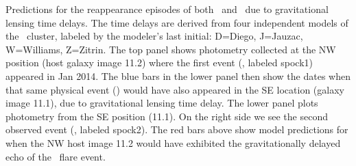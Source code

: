 \label{fig:SpockDelayPredictions}
Predictions for the reappearance episodes of both \spockone\ and \spocktwo\, due to gravitational lensing time delays.  The time delays are derived from four independent models of the \ cluster, labeled by the modeler's last initial: D=Diego, J=Jauzac, W=Williams, Z=Zitrin.  The top panel shows photometry collected at the NW position (host galaxy image 11.2) where the first event (\spockone, labeled spock1) appeared in Jan 2014. The blue bars in the lower panel then show the dates when that same physical event (\spockone) would have also appeared in the SE location (galaxy image 11.1), due to gravitational lensing time delay.  The lower panel plots photometry from the SE position (11.1). On the right side we see the second observed event (\spocktwo, labeled spock2).  The red bars above show model predictions for when the NW host image 11.2 would have exhibited the gravitationally delayed echo of the \spocktwo\ flare event.
  
  